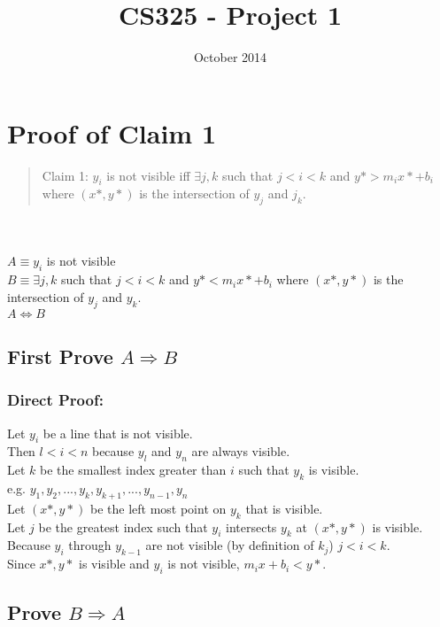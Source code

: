 \documentclass{article}
\title{CS325 - Project 1}
\author{Group #6\\
William Jernigan, Alexander Merrill, Sean Rettig}
\date{October 2014}
\begin{document}
\maketitle

\section*{Proof of Claim 1}

\begin{quote}
    Claim 1: $y_i$ is not visible iff $\exists j,k$ such that $j < i < k$ and $y* > m_i x* + b_i$ where $(x*,y*)$ is the intersection of $y_j$ and $j_k$.
\end{quote}\\
\\
$A \equiv y_i$ is not visible\\
$B \equiv \exists j,k$ such that $j < i < k$ and $y* < m_i x* + b_i$ where $(x*,y*)$ is the intersection of $y_j$ and $y_k$.\\
$A \Leftrightarrow B$

\subsection*{First Prove $A \Rightarrow B$}
    \subsubsection*{Direct Proof:}
    Let $y_i$ be a line that is not visible.\\
    Then $l < i < n$ because $y_l$ and $y_n$ are always visible.\\
    Let $k$ be the smallest index greater than $i$ such that $y_k$ is visible.\\
    e.g. $y_1,y_2,...,y_k,y_{k+1},...,y_{n-1},y_n$\\
    Let $(x*,y*)$ be the left most point on $y_k$ that is visible.\\
    Let $j$ be the greatest index such that $y_i$ intersects $y_k$ at $(x*,y*)$ is visible.\\
    Because $y_i$ through $y_{k-1}$ are not visible (by definition of $k_j$) $j < i < k$.\\
    Since $x*,y*$ is visible and $y_i$ is not visible, $m_i x + b_i < y*$.
    
\subsection*{Prove $B \Rightarrow A$}
\end{document}
